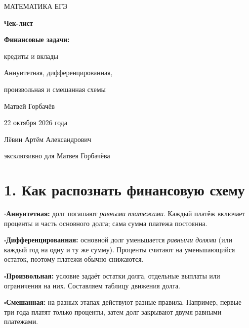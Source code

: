 \documentclass[a4paper,12pt]{article}
\newcommand{\mcheck}{\textcolor{accent}{\(\square\)}\hspace{3pt}}
\newcommand{\lessonhead}[1]{\section*{\color{darkaccent}#1}}
\begin{document}
\hypersetup{pageanchor=false}
\begin{titlepage}
\thispagestyle{empty}
\begin{center}
\vspace*{30mm}
{\color{accent}\Large МАТЕМАТИКА \quad\textbullet\quad ЕГЭ}\par
\vspace{18mm}
{\Huge\bfseries Чек-лист}\par
\vspace{6mm}
{\LARGE\color{darkaccent}\bfseries Финансовые задачи:}\par
\vspace{2mm}
{\LARGE\color{darkaccent}кредиты и вклады}\par
\vspace{17mm}
{\large Аннуитетная, дифференцированная,}\par
{\large произвольная и смешанная схемы}\par
\vspace{20mm}
{\large Матвей Горбачёв}\par
\vspace{3mm}
{\normalsize 22 октября 2026 года}\par
\vfill
{\small\color{textgray}Лёвин Артём Александрович}\par
{\small\color{textgray}эксклюзивно для Матвея Горбачёва}\par
\vspace{10mm}
\end{center}
\end{titlepage}
\hypersetup{pageanchor=true}

\lessonhead{1. Как распознать финансовую схему}
\mcheck\textbf{Аннуитетная:} долг погашают \emph{равными платежами}. Каждый платёж включает проценты и часть основного долга; сама сумма платежа постоянна.

\mcheck\textbf{Дифференцированная:} основной долг уменьшается \emph{равными долями} (или каждый год на одну и ту же сумму). Проценты считают на уменьшающийся остаток, поэтому платежи обычно снижаются.

\mcheck\textbf{Произвольная:} условие задаёт остатки долга, отдельные выплаты или ограничения на них. Составляем таблицу движения долга.

\mcheck\textbf{Смешанная:} на разных этапах действуют разные правила. Например, первые три года платят только проценты, затем долг закрывают двумя равными платежами.
\end{document}
